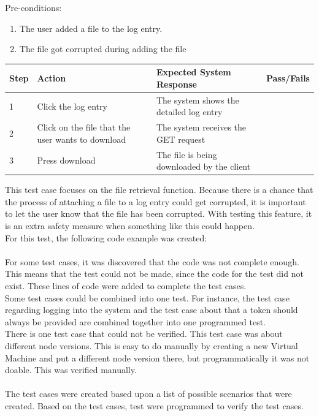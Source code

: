 \documentclass[paper=a4, fontsize=11pt,twoside]{scrartcl}	%
\begin{document}
Pre-conditions: \\
\begin{enumerate}
\item The user added a file to the log entry.
\item The file got corrupted during adding the file
\end{enumerate}

\begin{longtable}{ | p{0.8cm} | p{4.5cm} | p{6cm}  | p{1.5cm} |}
\hline
Step & Action & Expected System Response & Pass/Fails  \\ \hline
1 & Click the log entry & The system shows the detailed log entry &  \\ \hline
2 & Click on the file that the user wants to download & The system receives the GET request &  \\ \hline
3 & Press download & The file is being downloaded by the client &  \\ \hline
\end{longtable}
This test case focuses on the file retrieval function. Because there is a chance that the process of attaching a file to a log entry could get corrupted, it is important to let the user know that the file has been corrupted. With testing this feature, it is an extra safety measure when something like this could happen. \\ 
For this test, the following code example was created: \\ \\

For some test cases, it was discovered that the code was not complete enough. This means that the test could not be made, since the code for the test did not exist. These lines of code were added to complete the test cases. \\
Some test cases could be combined into one test. For instance, the test case regarding logging into the system and the test case about that a token should always be provided are combined together into one programmed test. \\
There is one test case that could not be verified. This test case was about different node versions. This is easy to do manually by creating a new Virtual Machine and put a different node version there, but programmatically it was not doable. This was verified manually. \\ \\

The test cases were created based upon a list of possible scenarios that were created. Based on the test cases, test were programmed to verify the test cases. 
\end{document}
